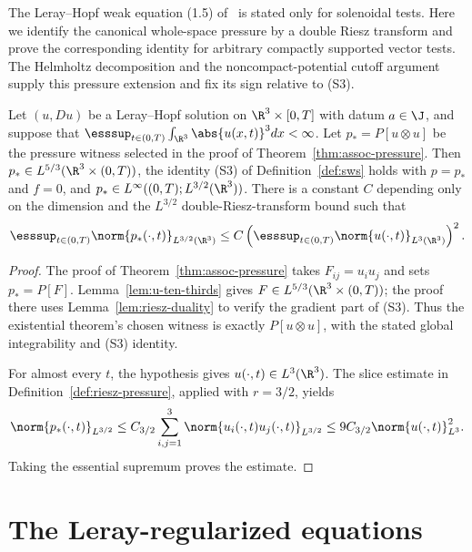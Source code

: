 \documentclass[11pt,reqno]{amsart}
\begin{document}
\begin{remark}
The Leray--Hopf weak equation (1.5) of~\cite[p.~212]{ESS2003} is stated only for
solenoidal tests. Here we identify the canonical whole-space pressure by a
double Riesz transform and prove the corresponding identity for arbitrary
compactly supported vector tests. The Helmholtz decomposition and the
noncompact-potential cutoff argument supply this pressure extension and fix
its sign relative to (S3).
\end{remark}



\begin{lemma}
\label{lem:assoc-pressure-L3}
Let $(u,Du)$ be a Leray--Hopf solution on $\R^3\times[0,T]$ with datum
$a\in\J$, and suppose that
$\esssup_{t\in(0,T)}\int_{\R^3}\abs{u(x,t)}^3dx<\infty$. Let
$p_*=P[u\otimes u]$ be the pressure witness
selected in the proof of Theorem~\ref{thm:assoc-pressure}. Then
$p_*\in L^{5/3}(\R^3\times(0,T))$, the identity (S3) of
Definition~\ref{def:sws} holds with $p=p_*$ and $f=0$, and
$p_*\in L^\infty((0,T);L^{3/2}(\R^3))$. There is a constant $C$ depending
only on the dimension and the $L^{3/2}$ double-Riesz-transform bound such that
\[
 \esssup_{t\in(0,T)}\norm{p_*(\cdot,t)}_{L^{3/2}(\R^3)}
 \le C\left(\esssup_{t\in(0,T)}
                 \norm{u(\cdot,t)}_{L^3(\R^3)}\right)^2.
\]
\end{lemma}

\begin{proof}
The proof of Theorem~\ref{thm:assoc-pressure} takes
$F_{ij}=u_i u_j$ and sets $p_*=P[F]$. Lemma~\ref{lem:u-ten-thirds}
gives $F\in L^{5/3}(\R^3\times(0,T))$; the proof there uses
Lemma~\ref{lem:riesz-duality} to verify the gradient part of (S3). Thus the
existential theorem's chosen witness is exactly $P[u\otimes u]$, with the
stated global integrability and (S3) identity.

For almost every $t$, the hypothesis gives
$u(\cdot,t)\in L^3(\R^3)$. The slice estimate in
Definition~\ref{def:riesz-pressure}, applied with $r=3/2$, yields
\[
 \norm{p_*(\cdot,t)}_{L^{3/2}}
 \le C_{3/2}\sum_{i,j=1}^3
                    \norm{u_i(\cdot,t)u_j(\cdot,t)}_{L^{3/2}}
 \le 9C_{3/2}\norm{u(\cdot,t)}_{L^3}^2.
\]
Taking the essential supremum proves the estimate.
\end{proof}


\section{The Leray-regularized equations}\label{sec:regularised}
\end{document}
